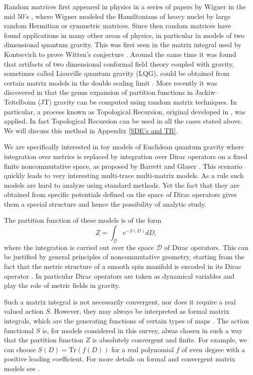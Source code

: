 \documentclass[10pt]{article}
\begin{document}
Random matrices first appeared in physics in a series of papers by Wigner in the mid 50's \cite{Wigner 1,Wigner 2,Wigner 3}, where Wigner modeled the Hamiltonians of heavy nuclei by large random Hermitian or symmetric matrices. Since then random matrices have found applications in many other areas of physics, in particular in models of two dimensional quantum gravity.
This was first seen in the matrix integral used by Kontsevich to prove Witten's conjecture  \cite{Witten, Kontsevich}. Around the same time it was found that artifacts of two dimensional conformal field theory coupled with gravity, sometimes called Liouville quantum gravity (LQG), could be obtained from certain matrix models in the double scaling limit \cite{DS multi 1,Ds multi 2,Eynard LQG}. More recently it was discovered in \cite{JT 1,JT 2,JT 3,JT 4} that the genus expansion of partition functions in Jackiw–Teitelboim (JT) gravity can be computed using random matrix techniques. In particular, a process known as Topological Recursion, original developed in \cite{Eynard TR}, was applied. In fact Topological Recursion can be used in all the cases stated above. We will discuss this method in Appendix \ref{SDE's and TR}.

We are specifically interested in toy models of Euclidean quantum gravity where integration over metrics is replaced by integration over Dirac operators on a fixed finite noncommutative space, as proposed by Barrett and Glaser \cite{Barrett2016}. This scenario quickly leads to very interesting  multi-trace multi-matrix models. As a rule such models are hard to analyze using standard methods. Yet the fact that they are obtained from specific potentials defined on the space of Dirac operators gives  them a special structure and hence the possibility of analytic study. 

The partition function of these models is of the form
\begin{equation*}
	Z=\int_{\mathcal{D}}e^{-S(D)}dD,
\end{equation*}
where the integration is carried out over the space $\mathcal{D}$ of Dirac operators. This can be justified by general principles of noncommutative geometry, starting from  the fact that the metric structure of a smooth spin manifold is encoded in its Dirac operator \cite{Connes95,Connes-2013,QFTNCG, Marcolli}.  In particular Dirac operators are  taken as  dynamical variables and play the role of metric  fields in gravity. 

Such a matrix integral is not necessarily convergent, nor does it require a real valued action $S$. However, they may always be interpreted as formal matrix integrals, which are the generating functions of certain types of maps \cite{BPZ,Eynard2018}.
The action functional $S$ is, for models considered in this survey, alwas chosen in such a way that the partition function $Z$ is absolutely convergent and finite. For example, we can choose $ S (D)= \text{Tr} (f (D))$ for a  real polynomial $f$ of even degree with a positive leading coefficient. 
For more details on  formal and convergent matrix models see \cite{Eynard combin, Deift}.
\end{document}

